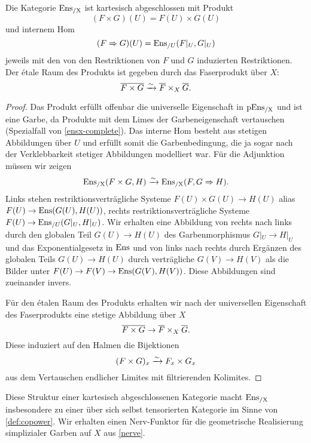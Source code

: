 \begin{prop} \label{ensx-cart-closed}
  Die Kategorie $\operatorname{Ens_{/X}}$ ist kartesisch abgeschlossen mit Produkt
  \[ (F \times G)(U) = F(U) \times G(U) \]
  und internem Hom
  \[ (F \Rightarrow G)(U) = \operatorname{Ens}_{/U}(F|_U, G|_U) \]
  jeweils mit den von den Restriktionen von $F$ und $G$ induzierten
  Restriktionen. Der étale Raum des Produkts ist gegeben durch das
  Faserprodukt über $X$:
  \[ \overline{F \times G}
     \xrightarrow[]{\sim} \overline{F} \times_X \overline{G}. \]
\end{prop}
\begin{proof}
  Das Produkt erfüllt offenbar die universelle Eigenschaft in $\operatorname{pEns_{/X}}$
  und ist eine Garbe, da Produkte mit dem Limes der Garbeneigenschaft
  vertauschen (Spezialfall von \ref{ensx-complete}). Das interne Hom
  besteht aus stetigen Abbildungen über $U$ und erfüllt somit die
  Garbenbedingung, die ja sogar nach der Verklebbarkeit stetiger
  Abbildungen modelliert war. Für die Adjunktion müssen wir zeigen
  \[ \operatorname{Ens_{/X}}(F \times G, H) \xrightarrow[]{\sim} \operatorname{Ens_{/X}}(F, G \Rightarrow H). \]
  Links stehen restriktionsverträgliche Systeme $F(U) \times G(U) \to
  H(U)$ alias $F(U) \to \operatorname{Ens}(G(U), H(U))$, rechts
  restriktionsverträgliche Systeme $F(U) \to \operatorname{Ens}_{/U}(G|_U,
  H|_U)$. Wir erhalten eine Abbildung von rechts nach links durch den
  globalen Teil $G(U) \to H(U)$ des Garbenmorphismus $G|_U \to H|_U$
  und das Exponentialgesetz in $\operatorname{Ens}$ und von links nach rechts durch
  Ergänzen des globalen Teils $G(U) \to H(U)$ durch verträgliche $G(V)
  \to H(V)$ als die Bilder unter $F(U) \to F(V) \to \operatorname{Ens}(G(V),
  H(V))$. Diese Abbildungen sind zueinander invers.

  Für den étalen Raum des Produkts erhalten wir nach der universellen
  Eigenschaft des Faserprodukts eine stetige Abbildung über $X$
  \[ \overline{F \times G}
  \to \overline{F} \times_X \overline{G}.
  \]
  Diese induziert auf den Halmen die Bijektionen
  \[ (F \times G)_x \xrightarrow[]{\sim} F_x \times G_x \]
  aus dem Vertauschen endlicher Limites mit filtrierenden Kolimites.
\end{proof}
Diese Struktur einer kartesisch abgeschlossenen Kategorie macht
$\operatorname{Ens_{/X}}$ insbesondere zu einer über sich selbst tensorierten Kategorie
im Sinne von \ref{def:copower}. Wir erhalten einen Nerv-Funktor für
die geometrische Realisierung simplizialer Garben auf $X$ aus
\ref{nerve}.

